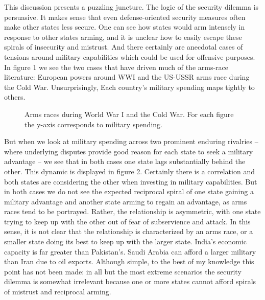 \documentclass[12pt]{article}
\begin{document}
This discussion presents a puzzling juncture. The logic of the security dilemma is persuasive. It makes sense that even defense-oriented security measures often make other states less secure. One can see how states would arm intensely in response to other states arming, and it is unclear how to easily escape these spirals of insecurity and mistrust. And there certainly are anecdotal cases of tensions around military capabilities which could be used for offensive purposes. In figure 1 we see the two cases that have driven much of the arms-race literature: European powers around WWI and the US-USSR arms race during the Cold War. Unsurprisingly, Each country's military spending maps tightly to others.

\vspace{1em}

\begin{figure}[!h]
\begin{center}\resizebox{0.95\linewidth}{!}{%

}
\caption{Arms races during World War I and the Cold War. For each figure the y-axis corresponds to military spending.}
\end{center}
\end{figure}


But when we look at military spending across two prominent enduring rivalries -- where underlying disputes provide good reason for each state to seek a military advantage -- we see that in both cases one state lags substantially behind the other. This dynamic is displayed in figure 2. Certainly there is a correlation and both states are considering the other when investing in military capabilities. But in both cases we do not see the expected reciprocal spiral of one state gaining a military advantage and another state arming to regain an advantage, as arms races tend to be portrayed. Rather, the relationship is asymmetric, with one state trying to keep up with the other out of fear of subservience and attack. In this sense, it is not clear that the relationship is characterized by an arms race, or a smaller state doing its best to keep up with the larger state. India's economic capacity is far greater than Pakistan's. Saudi Arabia can afford a larger military than Iran due to oil exports. Although simple, to the best of my knowledge this point has not been made: in all but the most extreme scenarios the security dilemma is somewhat irrelevant because one or more states cannot afford spirals of mistrust and reciprocal arming.
\end{document}
